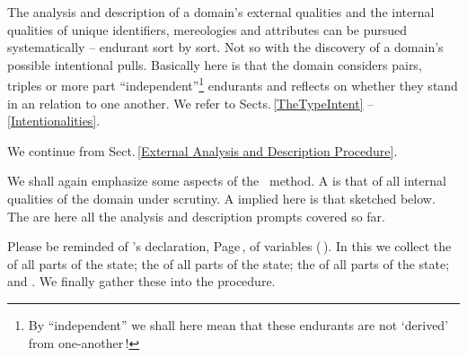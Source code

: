 %

\begynd
\pind The analysis and description of a domain's 
\begynd
\pind external qualities and 
\pind the internal qualities of \nyl unique identifiers, mereologies and attributes
\pind can be pursued systematically --
\pind endurant sort by sort. 
\afslut
\mnewfoil
\pind Not so with the discovery of \nyl a domain's possible intentional
      pulls.
\pind Basically  here is
\begynd
\pind  that the domain
\pind considers pairs, triples or more \nyl part
``independent''\footnote{By ``independent'' we shall here mean that
  these endurants are not `derived' from one-another\,!} endurants
\pind and reflects on whether they stand \nyl in an 
     \nyl relation to one another.
\afslut
\pind We refer to Sects.\,\ref{TheTypeIntent} -- \ref{Intentionalities}.
\afslut


%
\label{kap4.Intentionality.n}

\label{The Procedure II}\label{A Domain Discovery Process, II}
\label{An Internal Qualities Analysis and Description Procedure}

\begynd
\pind We continue from Sect.\,\ref{External Analysis and Description Procedure}.
\afslut


\begynd
\pind We shall again emphasize some
      aspects \nyl of the \daad\ method.
\begynd
\pind A  %
      is that of  all internal 
      qualities of the domain under scrutiny.
\pind A  implied here
      is that sketched below.
\pind The  %
      are here all the analysis and description prompts covered so far.    
\afslut
\afslut

\pos{\psno}{\mnewfoil}
\begynd
\pind Please be reminded of 's  
      declaration, Page\,\pageref{DiscoverySchema0}, of 
      variables (\,\pageref{DiscoverySchema0}). 
\pind In this  we collect
\begynd
\pind {} the  of all parts of the state;
\pind {} the  of all parts of the state; 
\pind {} the  of all parts of the state; and
\pind {}.
\afslut
\pind {} We finally gather these into the  procedure\ysf{}.
\afslut
\noindent

